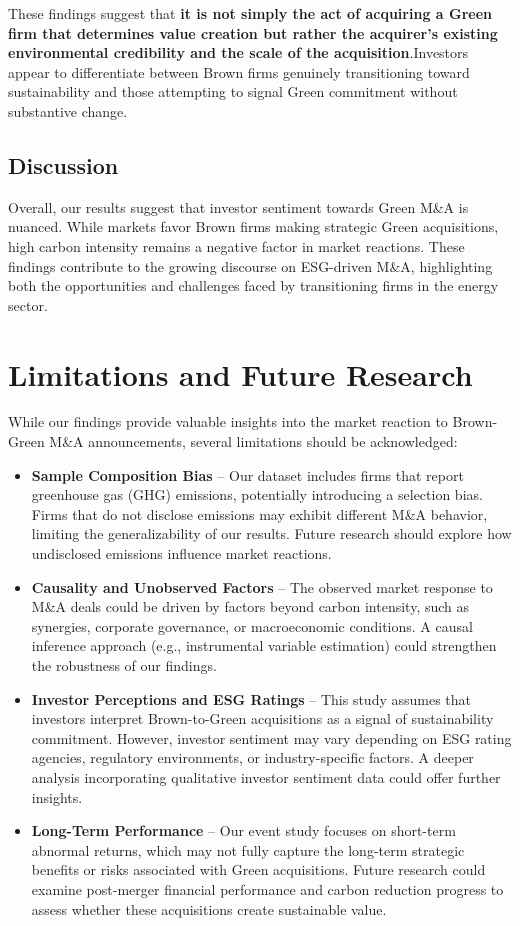 \documentclass[a4paper]{article}
\begin{document}
These findings suggest that \textbf{it is not simply the act of acquiring a Green firm that determines value creation but rather the acquirer's existing environmental credibility and the scale of the acquisition}.Investors appear to differentiate between Brown firms genuinely transitioning toward sustainability and those attempting to signal Green commitment without substantive change.

\subsection{Discussion}
Overall, our results suggest that investor sentiment towards Green M\&A is nuanced. While markets favor Brown firms making strategic Green acquisitions, high carbon intensity remains a negative factor in market reactions. These findings contribute to the growing discourse on ESG-driven M\&A, highlighting both the opportunities and challenges faced by transitioning firms in the energy sector.

\section{Limitations and Future Research}
While our findings provide valuable insights into the market reaction to Brown-Green M\&A announcements, several limitations should be acknowledged:

\begin{itemize}
    \item \textbf{Sample Composition Bias} – Our dataset includes firms that report greenhouse gas (GHG) emissions, potentially introducing a selection bias. Firms that do not disclose emissions may exhibit different M\&A behavior, limiting the generalizability of our results. Future research should explore how undisclosed emissions influence market reactions.
    
    \item \textbf{Causality and Unobserved Factors} – The observed market response to M\&A deals could be driven by factors beyond carbon intensity, such as synergies, corporate governance, or macroeconomic conditions. A causal inference approach (e.g., instrumental variable estimation) could strengthen the robustness of our findings.

    \item \textbf{Investor Perceptions and ESG Ratings} – This study assumes that investors interpret Brown-to-Green acquisitions as a signal of sustainability commitment. However, investor sentiment may vary depending on ESG rating agencies, regulatory environments, or industry-specific factors. A deeper analysis incorporating qualitative investor sentiment data could offer further insights.

    \item \textbf{Long-Term Performance} – Our event study focuses on short-term abnormal returns, which may not fully capture the long-term strategic benefits or risks associated with Green acquisitions. Future research could examine post-merger financial performance and carbon reduction progress to assess whether these acquisitions create sustainable value.
\end{itemize}
\end{document}
